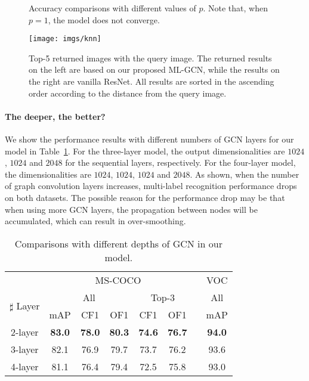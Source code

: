 \documentclass[10pt,twocolumn,letterpaper]{article}
\begin{document}
\begin{figure}
	\centering
	\caption{Accuracy comparisons with different values of $p$. Note that, when $p=1$, the model does not converge.}
	\label{fig:proportion}
\end{figure}

\begin{figure*}[t!]
	\centering
	\texttt{[image: imgs/knn]}
	\vspace{-0.5em}
	\caption{Top-5 returned images with the query image. The returned results on the left are based on our proposed ML-GCN, while the results on the right are vanilla ResNet. All results are sorted in the ascending order according to the distance from the query image.}
	\label{fig:knn}
\end{figure*}


\paragraph{The deeper, the better?}

We show the performance results with different numbers of GCN layers for our model in Table~\ref{table:depth}. For the three-layer model, the output dimensionalities are $1024$, $1024$ and $2048$ for the sequential layers, respectively. For the four-layer model, the dimensionalities are $1024$, $1024$, $1024$ and $2048$. As shown, when the number of graph convolution layers increases, multi-label recognition performance drops on both datasets. The possible reason for the performance drop may be that when using more GCN layers, the propagation between nodes will be accumulated, which can result in over-smoothing.



\begin{table}[t]
\footnotesize
\centering
\caption{Comparisons with different depths of GCN in our model.}
\vspace{0.1cm}
\begin{tabular}{|c||c|c|c||c|c|c|c|}
\cline{1-6} \cline{8-8} 
        & \multicolumn{5}{c|}{MS-COCO} && VOC \\
\cline{1-6} \cline{8-8}
\multirow{2}{*}{$\sharp$ Layer} & \multicolumn{3}{c||}{{All}} & \multicolumn{2}{c|}{{Top-3}} && All \\
\cline{2-6} \cline{8-8} & mAP & CF1 & OF1 & CF1 & OF1 && mAP \\
\cline{1-6} \cline{8-8}
2-layer & \textbf{83.0} & \textbf{78.0} & \textbf{80.3} & \textbf{74.6} & \textbf{76.7} && \textbf{94.0}\\
3-layer & 82.1 & 76.9 & 79.7 & 73.7 & 76.2 && 93.6\\
4-layer & 81.1 & 76.4 & 79.4 & 72.5 & 75.8 && 93.0\\
\cline{1-6} \cline{8-8}
\end{tabular}
\label{table:depth}
\end{table}
\end{document}
